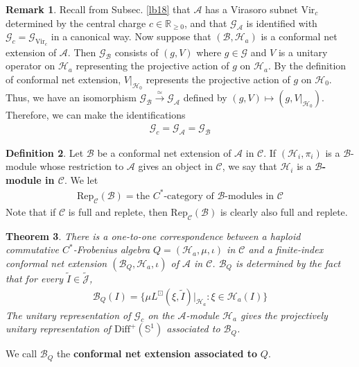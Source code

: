 \documentclass[11pt,b5paper,notitlepage]{article}
\theoremstyle{definition}
\newtheorem{df}{Definition}[section]
\newtheorem{rem}[df]{Remark}
\theoremstyle{plain}
\newtheorem{thm}[df]{Theorem}
\newcommand{\mc}{\mathcal}
\newcommand{\wtd}{\widetilde}
\newcommand{\Rep}{\mathrm{Rep}}
\newcommand{\Diffp}{\mathrm{Diff}^+}
\newcommand{\Vir}{\mathrm{Vir}}
\newcommand{\GA}{\mathscr G_{\mathcal A}}
\newcommand{\scr}{\mathscr}
\newcommand{\Jtd}{\widetilde{\mathcal J}}
\newcommand{\Rbb}{\mathbb R}
\newcommand{\Sbb}{{\mathbb S}}
\newcommand{\Gc}{\mathscr G_c}
\numberwithin{equation}{section}
\begin{document}
\begin{rem}
Recall from Subsec. \ref{lb18} that $\mc A$ has a Virasoro subnet $\Vir_c$ determined by the central charge $c\in\Rbb_{\geq0}$, and that $\GA$ is identified with $\Gc=\scr G_{\Vir_c}$ in a canonical way. Now suppose that $(\mc B,\mc H_a)$ is a conformal net extension of $\mc A$. Then $\scr G_{\mc B}$ consists of $(g,V)$ where $g\in\scr G$ and $V$ is a unitary operator on $\mc H_a$ representing the projective action of $g$ on $\mc H_a$. By the definition of conformal net extension, $V|_{\mc H_0}$ represents the projective action of $g$ on $\mc H_0$. Thus, we have an isomorphism $\scr G_{\mc B}\xrightarrow{\simeq}\GA$ defined by $(g,V)\mapsto(g,V|_{\mc H_0})$. Therefore, we can make the identifications
\begin{align*}
\Gc=\GA=\scr G_{\mc B}
\end{align*}
\end{rem}



\begin{df}\label{lb100}
Let $\mc B$ be a conformal net extension of $\mc A$ in $\scr C$. If $(\mc H_i,\pi_i)$ is a $\mc B$-module whose restriction to $\mc A$ gives an object in $\scr C$, we say that $\mc H_i$ is a \textbf{$\mc B$-module in $\scr C$}. We let
\begin{align*}
\pmb{\Rep_{\scr C}(\mc B)}=\text{the $C^*$-category of $\mc B$-modules in $\scr C$}
\end{align*}
Note that if $\scr C$ is full and replete, then $\Rep_{\scr C}(\mc B)$ is clearly also full and replete.
\end{df}


\begin{thm}\label{lb26}
There is a one-to-one correspondence between a haploid commutative $C^*$-Frobenius algebra $Q=(\mc H_a,\mu,\iota)$ in $\scr C$ and a finite-index conformal net extension $(\mc B_Q,\mc H_a,\iota)$ of $\mc A$ in $\scr C$. $\mc B_Q$ is determined by the fact that for every $\wtd I\in\Jtd$,
\begin{align}
\mc B_Q(I)=\big\{\mu L^\boxdot(\xi,\wtd I)|_{\mc H_a}:\xi\in\mc H_a(I)  \big\}
\end{align}
The unitary representation of $\Gc$ on the $\mc A$-module $\mc H_a$ gives the projectively unitary representation of $\Diffp(\Sbb^1)$ associated to $\mc B_Q$.
\end{thm}

We call $\mc B_Q$ the \textbf{conformal net extension associated to} $Q$.
\end{document}
